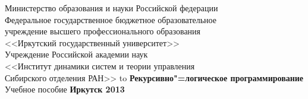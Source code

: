 \documentclass[14pt, openany, twoside, final]{extbook} %
\begin{document}

\renewcommand{\chaptername}{} %
\renewcommand{\refname}{Рекомендуемая литература} %
\renewcommand{\bibname}{\refname}
\begin{titlepage}
\thispagestyle{empty}
\begin{center}{\small{}
Министерство образования и науки
Российской федерации \\
Федеральное государственное бюджетное образовательное\\
учреждение высшего профессионального образования\\
<<Иркутский государственный университет>>\\[2ex]
    Учреждение Российской академии наук \\
<<Институт динамики систем и теории управления \\
Сибирского отделения РАН>>
}
\vfill
\hbox to \linewidth{\hfill\bfseries Е.~А.~Черкашин\hfill}
 \vspace{2em}
{\large\bfseries Рекурсивно"=логическое программирование}\\
 \vspace{2em}
{Учебное пособие}
\vfill
\vfill
 \textbf{Иркутск 2013}
\end{center}
\end{titlepage}
\end{document}

